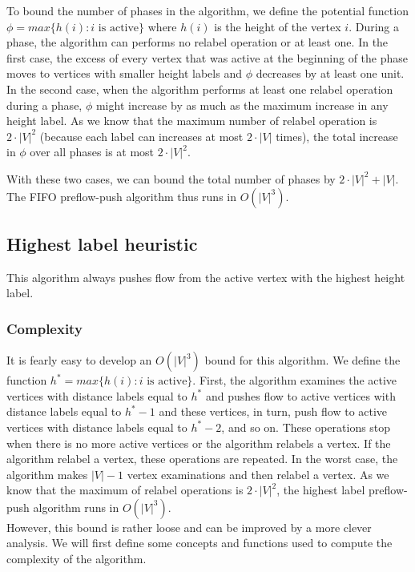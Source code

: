 To bound the number of phases in the algorithm, we define the potential function $\phi = max\{h(i) : i\text{ is active}\}$ where $h(i)$ is the height of the vertex $i$.
During a phase, the algorithm can performs no relabel operation or at least one. In the first case, the excess of every vertex that was active at the beginning of the phase moves to vertices with smaller height labels and $\phi$ decreases by at least one unit. In the second case, when the algorithm performs at least one relabel operation during a phase, $\phi$ might increase by as much as the maximum increase in any height label. As we know that the maximum number of relabel operation is $2\cdot|V|^2$ (because each label can increases at most $2\cdot|V|$ times), the total increase in $\phi$ over all phases is at most $2\cdot|V|^2$.

With these two cases, we can bound the total number of phases by $2\cdot|V|^2 + |V|$. The FIFO preflow-push algorithm thus runs in $O(|V|^3)$.

\subsection{Highest label heuristic}
\label{sec:hlh}

This algorithm always pushes flow from the active vertex with the highest height label. 

\subsubsection{Complexity}

It is fearly easy to develop an $O(|V|^3)$ bound for this algorithm. We define the function $h^{*} = max\{h(i): i\text{ is active}\}$. First, the algorithm examines the active vertices with distance labels equal to $h^{*}$ and pushes flow to active vertices with distance labels equal to $h^{*}-1$ and these vertices, in turn, push flow to active vertices with distance labels equal to $h^{*}-2$, and so on. These operations stop when there is no more active vertices or the algorithm relabels a vertex. If the algorithm relabel a vertex, these operations are repeated. In the worst case, the algorithm makes $|V| - 1$ vertex examinations and then relabel a vertex. As we know that the maximum of relabel operations is $2\cdot|V|^2$, the highest label preflow-push algorithm runs in $O(|V|^3)$.\\

However, this bound is rather loose and can be improved by a more clever analysis. We will first define some concepts and functions used to compute the complexity of the algorithm.\\

